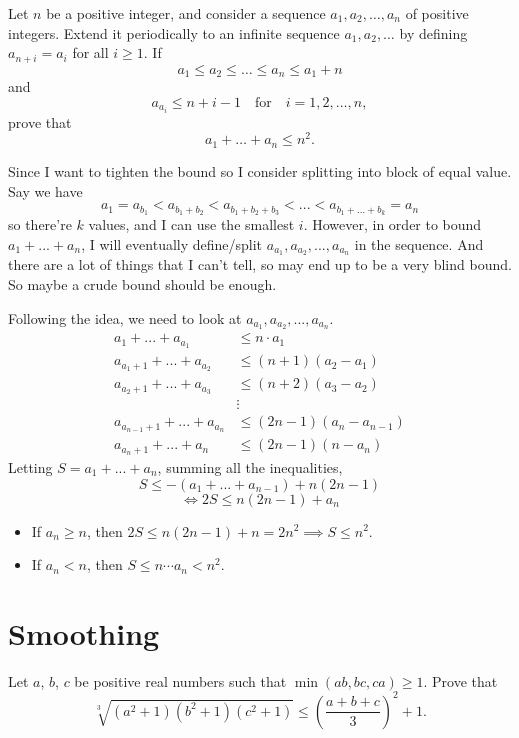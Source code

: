 \documentclass[11pt]{scrartcl}
\begin{document}
\begin{Problem}
Let $n$ be a positive integer, and consider a sequence $a_1 , a_2 , \dotsc , a_n $ of positive integers. Extend it periodically to an infinite sequence $a_1 , a_2 , \dotsc $ by defining $a_{n+i} = a_i $ for all $i \ge 1$. If\[a_1 \le a_2 \le \dots \le a_n \le a_1 +n  \]and\[a_{a_i } \le n+i-1 \quad\text{for}\quad i=1,2,\dotsc, n, \]prove that\[a_1 + \dots +a_n \le n^2. \]
\end{Problem}


\begin{motivation}
Since I want to tighten the bound so I consider splitting into block of equal value. Say we have
\[a_1 = a_{b_1} < a_{b_1 + b_2} < a_{b_1 + b_2 + b_3} < ... < a_{b_1 + ... + b_k} = a_n\]
so there're $k$ values, and I can use the smallest $i$. However, in order to bound $a_1 + ... + a_n$, I will eventually define/split $a_{a_1}, a_{a_2}, ..., a_{a_n}$ in the sequence. And there are a lot of things that I can't tell, so may end up to be a very blind bound. So maybe a crude bound should be enough.
\end{motivation}

Following the idea, we need to look at $a_{a_1}, a_{a_2}, ..., a_{a_n}$.
\begin{align*}
    a_1 + ... + a_{a_1} &\le n \cdot a_1\\
    a_{a_1 + 1} + ... + a_{a_2} &\le (n+1)(a_2 - a_1)\\
    a_{a_2 + 1} + ... + a_{a_3} &\le (n+2)(a_3-a_2)\\
    &\vdots\\
    a_{a_{n-1} + 1} + ... + a_{a_n} &\le (2n-1)(a_n - a_{n-1})\\
    a_{a_n + 1} + ... + a_n &\le (2n-1)(n-a_n)
\end{align*}
Letting $S = a_1 + ... + a_n$, summing all the inequalities,
\[S \le -(a_1 + ... + a_{n-1}) + n(2n-1)\]
\[\iff 2S \le n(2n-1) + a_n\]
\begin{itemize}
    \item If $a_n \ge n$, then $2S \le n(2n-1)+n = 2n^2 \implies S \le n^2$.
    \item If $a_n < n$, then $S \le n \cdots a_n < n^2$.
\end{itemize}









\section{Smoothing}

\begin{Problem}
Let $a$, $b$, $c$ be positive real numbers such that $\min(ab,bc,ca) \ge 1$. Prove that$$\sqrt[3]{(a^2+1)(b^2+1)(c^2+1)} \le \left(\frac{a+b+c}{3}\right)^2 + 1.$$
\end{Problem}
\end{document}
